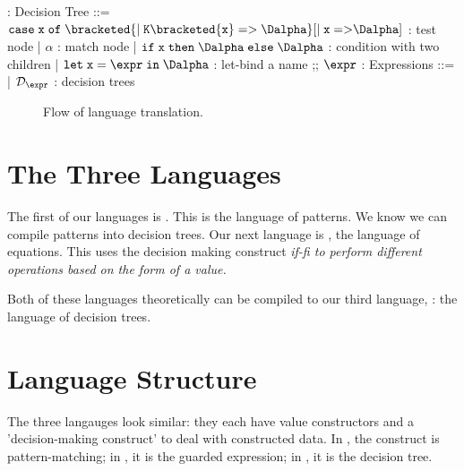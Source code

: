 \documentclass[]{article}
\begin{document}
\begin{center}
    \begin{bnf}
        \Dalpha : \textsf{Decision Tree} ::= 
        $\tt{case} \; x \; \tt{of} \; 
        \bracketed{\vert \; K\bracketed{x} \; \tt{=>} \; \Dalpha}
        [\vert \; x \; \tt{=>} \Dalpha]$ : test node 
        | $\alpha$ : match node 
        | $\tt{if} \; x \; \tt{then} \; \Dalpha \; \tt{else} \; \Dalpha$ : condition with two children 
        | $\tt{let} \; x \; \tt{=} \; \expr \; \tt{in} \; \Dalpha$ : let-bind a name
        ;;
        $\expr$ : \textsf{Expressions} ::=
        | $\mathcal{D}_{\expr}$ : decision trees 
    \end{bnf}
\end{center}

\bigskip
\begin{figure}[H]
    \centering
    \caption{Flow of language translation.}
    \label{fig:graph}
\end{figure}

\section{The Three Languages}

The first of our languages is \Pplus. This is the language of patterns. We know
we can compile patterns into decision trees. Our next language is \VMinus, the
language of equations. This uses the decision making construct \it{if-fi} to
perform different operations based on the form of a value. 

Both of these languages theoretically can be compiled to our third language,
\D: the language of decision trees. 

\bigskip

\section{Language Structure}

The three langauges look similar: they each have value constructors and 
a 'decision-making construct' to deal with constructed data. In \Pplus, the 
construct is pattern-matching; in \VMinus, it is the guarded expression; 
in \D, it is the decision tree. 
\end{document}
